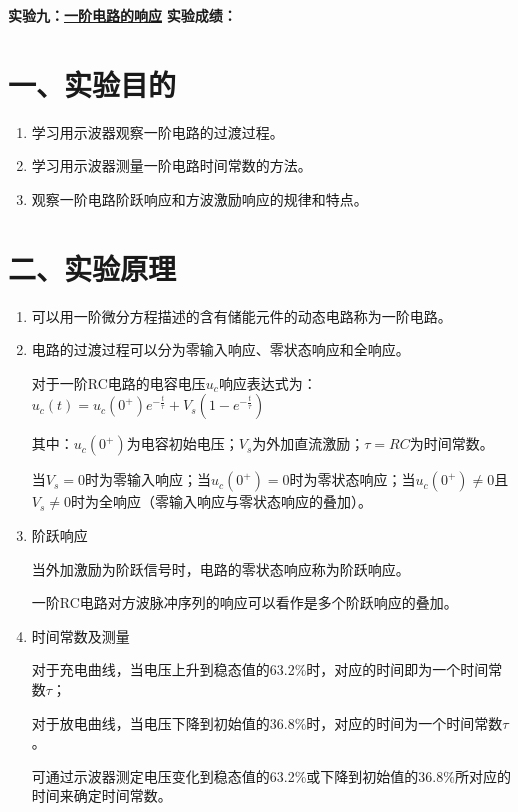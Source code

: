 \documentclass[12pt,a4paper]{article}
\begin{document}
\noindent
{\Large \textbf{实验九：}\underline{\textbf{一阶电路的响应}}} \hfill {\Large \textbf{实验成绩：}\underline{\hspace{3cm}}}
\vspace{0.5cm}

\section*{一、实验目的}
\begin{enumerate}
    \item 学习用示波器观察一阶电路的过渡过程。
    \item 学习用示波器测量一阶电路时间常数的方法。
    \item 观察一阶电路阶跃响应和方波激励响应的规律和特点。
\end{enumerate}

\section*{二、实验原理}

\begin{enumerate}
    \item 可以用一阶微分方程描述的含有储能元件的动态电路称为一阶电路。
    
    \item 电路的过渡过程可以分为零输入响应、零状态响应和全响应。
    
    对于一阶RC电路的电容电压$u_c$响应表达式为：$u_c(t) = u_c(0^+)e^{-\frac{t}{\tau}} + V_s(1-e^{-\frac{t}{\tau}})$
    
    其中：$u_c(0^+)$为电容初始电压；$V_s$为外加直流激励；$\tau = RC$为时间常数。
    
    当$V_s = 0$时为零输入响应；当$u_c(0^+) = 0$时为零状态响应；当$u_c(0^+) \neq 0$且$V_s \neq 0$时为全响应（零输入响应与零状态响应的叠加）。
    
    \item 阶跃响应
    
    当外加激励为阶跃信号时，电路的零状态响应称为阶跃响应。
    
    一阶RC电路对方波脉冲序列的响应可以看作是多个阶跃响应的叠加。
    
    \item 时间常数及测量
    
    对于充电曲线，当电压上升到稳态值的63.2\%时，对应的时间即为一个时间常数$\tau$；
    
    对于放电曲线，当电压下降到初始值的36.8\%时，对应的时间为一个时间常数$\tau$。
    
    可通过示波器测定电压变化到稳态值的63.2\%或下降到初始值的36.8\%所对应的时间来确定时间常数。
\end{enumerate}
\end{document}
